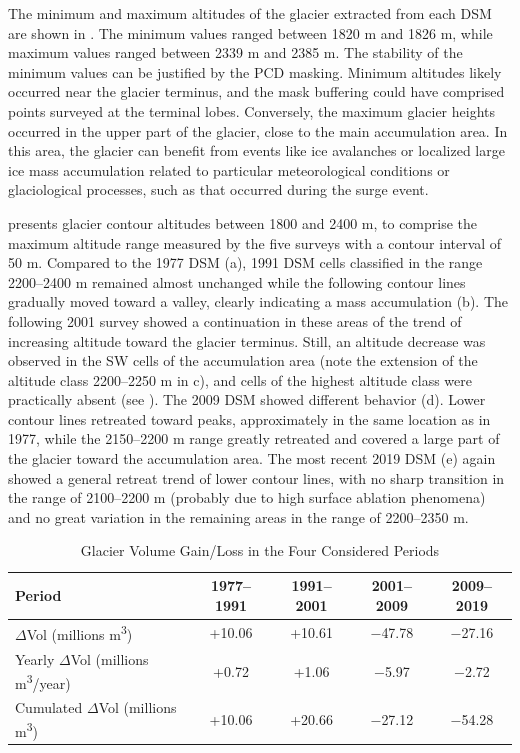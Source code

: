 The minimum and maximum altitudes of the glacier extracted from each DSM are shown in .
The minimum values ranged between 1820 m and 1826 m, while maximum values ranged between 2339 m and 2385 m. 
The stability of the minimum values can be justified by the PCD masking. 
Minimum altitudes likely occurred near the glacier terminus, and the mask buffering could have comprised points surveyed at the terminal lobes.
Conversely, the maximum glacier heights occurred in the upper part of the glacier, close to the main accumulation area.
In this area, the glacier can benefit from events like ice avalanches or localized large ice mass accumulation related to particular meteorological conditions or glaciological processes, such as that occurred during the surge event.

 presents glacier contour altitudes between 1800 and 2400 m, to comprise the maximum altitude range measured by the five surveys with a contour interval of 50 m.
Compared to the 1977 DSM (a), 1991 DSM cells classified in the range 2200–2400 m remained almost unchanged while the following contour lines gradually moved toward a valley, clearly indicating a mass accumulation (b).
The following 2001 survey showed a continuation in these areas of the trend of increasing altitude toward the glacier terminus. 
Still, an altitude decrease was observed in the SW cells of the accumulation area (note the extension of the altitude class 2200–2250 m in c), and cells of the highest altitude class were practically absent (see ). 
The 2009 DSM showed different behavior (d). 
Lower contour lines retreated toward peaks, approximately in the same location as in 1977, while the 2150–2200 m range greatly retreated and covered a large part of the glacier toward the accumulation area.
The most recent 2019 DSM (e) again showed a general retreat trend of lower contour lines, with no sharp transition in the range of 2100–2200 m (probably due to high surface ablation phenomena) and no great variation in the remaining areas in the range of 2200–2350 m.

\begin{table}[ht]
  \centering
  \caption{Glacier Volume Gain/Loss in the Four Considered Periods}
  \label{tab:2:glacier_volume_variations}
  \begin{tabular}{lcccc}
    \hline
    Period & 1977--1991 & 1991--2001 & 2001--2009 & 2009--2019 \\
    \hline
    $\Delta$Vol (millions m\textsuperscript{3}) & +10.06 & +10.61 & $-$47.78 & $-$27.16 \\
    Yearly $\Delta$Vol (millions m\textsuperscript{3}/year) & +0.72 & +1.06 & $-$5.97 & $-$2.72 \\
    Cumulated $\Delta$Vol (millions m\textsuperscript{3}) & +10.06 & +20.66 & $-$27.12 & $-$54.28 \\
    \hline
  \end{tabular}
\end{table}

